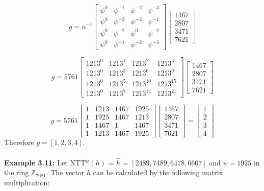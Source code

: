 \documentclass[12pt]{report}
\begin{document}
\[g=n^{-1}\begin{bmatrix}\psi^{0}&\psi^{-1}&\psi^{-2}&\psi^{-3}\\ \psi^{0}&\psi^{-3}&\psi^{-2}&\psi^{-1}\\ \psi^{0}&\psi^{-2}&\psi^{0}&\psi^{-2}\\ \psi^{0}&\psi^{-1}&\psi^{-2}&\psi^{-3}\end{bmatrix}\begin{bmatrix}1467\\ 2807\\ 3471\\ 7621\end{bmatrix}\]

\[g=5761\begin{bmatrix}1213^{0}&1213^{1}&1213^{2}&1213^{3}\\ 1213^{0}&1213^{3}&1213^{6}&1213^{9}\\ 1213^{0}&1213^{5}&1213^{10}&1213^{15}\\ 1213^{0}&1213^{7}&1213^{14}&1213^{21}\end{bmatrix}\begin{bmatrix}1467\\ 2807\\ 3471\\ 7621\end{bmatrix}\]

\[g=5761\begin{bmatrix}1&1213&1467&1925\\ 1&1925&1467&1213\\ 1&1467&1&1467\\ 1&1213&1467&1925\end{bmatrix}\begin{bmatrix}1467\\ 2807\\ 3471\\ 7621\end{bmatrix}=\begin{bmatrix}1\\ 2\\ 3\\ 4\end{bmatrix}\]
Therefore $g=[1,2,3,4]$. \\ \\
\textbf{Example 3.11:} Let NTT$^{\psi}(h)$ = $\hat{h}$ = $[2489,7489,6478,6607]$ and $\psi = 1925$ in the ring $\mathbb{Z}_{7681}$. The vector $h$ can be calculated by the following matrix multiplication:
\end{document}
